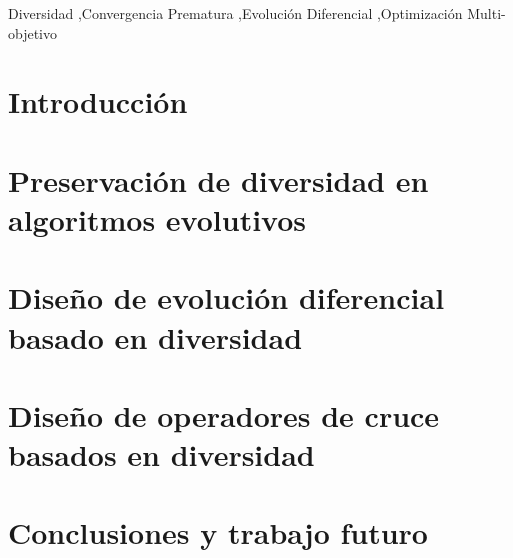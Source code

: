 \documentclass[3p]{elsarticle}
\begin{document}
\begin{frontmatter}
\begin{keyword}
Diversidad \sep Convergencia Prematura \sep Evolución Diferencial \sep Optimización Multi-objetivo 
\end{keyword}

\end{frontmatter}


\section{Introducción}
\label{sec:Introduction}


\section{Preservación de diversidad en algoritmos evolutivos}
\label{sec:Mecanismos}


\section{Diseño de evolución diferencial basado en diversidad}
\label{sec:ED}


\section{Diseño de operadores de cruce basados en diversidad}
\label{sec:Operadores}


\section{Conclusiones y trabajo futuro}
\label{sec:Conclusion}




\end{document}
